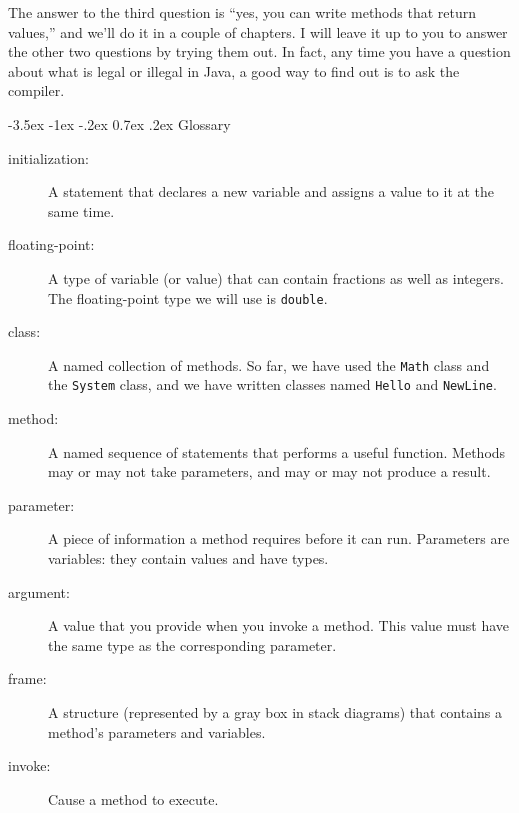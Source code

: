 \documentclass{book}
\makeatletter
\renewcommand{\section}{\@startsection 
    {section} {1} {0mm}%
    {-3.5ex \@plus -1ex \@minus -.2ex}%
    {0.7ex \@plus.2ex}%
    {\normalfont\Large\bfseries}}
\makeatother
\begin{document}
The answer to the third question is ``yes, you can write methods that
return values,'' and we'll do it in a couple of chapters.  I will
leave it up to you to answer the other two questions by trying them
out.  In fact, any time you have a question about what is legal or
illegal in Java, a good way to find out is to ask the compiler.


\section{Glossary}

\begin{description}

\item[initialization:]  A statement that declares a new variable
and assigns a value to it at the same time.

\item[floating-point:] A type of variable (or value) that can contain
fractions as well as integers.  The floating-point type we will
use is {\tt double}.

\item[class:]  A named collection of methods.  So far, we have used
the {\tt Math} class and the {\tt System} class, and we have
written classes named {\tt Hello} and {\tt NewLine}.

\item[method:]  A named sequence of statements that performs a
useful function.  Methods may or may not take parameters, and may
or may not produce a result.

\item[parameter:]  A piece of information a method requires before
it can run.  Parameters are variables: they contain values and have types.

\item[argument:]  A value that you provide when you invoke a
method.  This value must have the same type as the corresponding
parameter.

\item[frame:] A structure (represented by a gray box in stack diagrams)
that contains a method's parameters and variables.

\item[invoke:]  Cause a method to execute.


\end{description}
\end{document}
